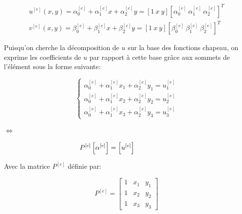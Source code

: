 \documentclass{article}
\begin{document}
\begin{align}
    u^{[e]}(x,y) = \alpha_0^{[e]} + \alpha_1^{[e]} x + \alpha_2^{[e]} y
    = \left[1 \ x \ y\right]
    \left[ \alpha_0^{[e]} \ \alpha_1^{[e]} \ \alpha_2^{[e]} \right]^T \\
    v^{[e]}(x,y) = \beta_0^{[e]} + \beta_1^{[e]} x + \beta_2^{[e]} y
    = \left[1 \ x \ y\right]
    \left[ \beta_0^{[e]} \ \beta_1^{[e]} \ \beta_2^{[e]} \right]^T
\end{align}

Puisqu'on cherche la décomposition de $u$ sur la 
base des fonctions chapeau, on exprime les coefficients de $u$
par rapport à cette base grâce aux sommets de l'élément
sous la forme suivante:

\vspace{0.5cm}

\begin{minipage}{0.45\textwidth}
    \begin{equation*}\begin{cases}
        \alpha_0^{[e]} + \alpha_1^{[e]} x_1
        + \alpha_2^{[e]} y_1 = u^{[e]}_1 \\
        \alpha_0^{[e]} + \alpha_1^{[e]} x_2
        + \alpha_2^{[e]} y_2 = u^{[e]}_2 \\
        \alpha_0^{[e]} + \alpha_1^{[e]} x_3
        + \alpha_2^{[e]} y_3 = u^{[e]}_3
    \end{cases}\end{equation*}
\end{minipage}
\begin{minipage}{0.01\textwidth}
    \centering
    $\Leftrightarrow$
\end{minipage}
\begin{minipage}{0.45\textwidth}
    
    \begin{equation}
        \hspace{-2cm} P^{[e]} \left[\alpha^{[e]}\right] = \left[u^{[e]}\right]
        \label{eq:p_alpha_u}
    \end{equation}
\end{minipage}

\vspace{5mm}

Avec la matrice $P^{[e]}$ définie par:

\begin{equation}
    P^{[e]} = \begin{bmatrix}
        1 & x_1 & y_1 \\
        1 & x_2 & y_2 \\
        1 & x_3 & y_3
    \end{bmatrix}
\end{equation}
\end{document}
